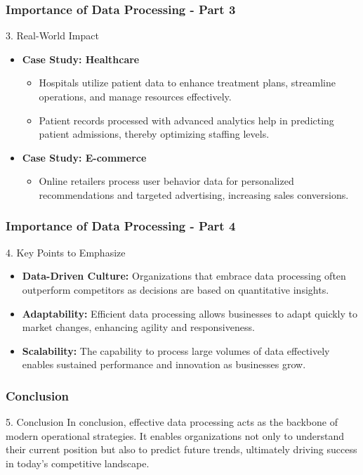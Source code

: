 \documentclass[aspectratio=169]{beamer}
\begin{document}
\begin{frame}[fragile]
    \frametitle{Importance of Data Processing - Part 3}
    \begin{block}{3. Real-World Impact}
        \begin{itemize}
            \item \textbf{Case Study: Healthcare}
            \begin{itemize}
                \item Hospitals utilize patient data to enhance treatment plans, streamline operations, and manage resources effectively.
                \item Patient records processed with advanced analytics help in predicting patient admissions, thereby optimizing staffing levels.
            \end{itemize}
            \item \textbf{Case Study: E-commerce}
            \begin{itemize}
                \item Online retailers process user behavior data for personalized recommendations and targeted advertising, increasing sales conversions.
            \end{itemize}
        \end{itemize}
    \end{block}
\end{frame}

\begin{frame}[fragile]
    \frametitle{Importance of Data Processing - Part 4}
    \begin{block}{4. Key Points to Emphasize}
        \begin{itemize}
            \item \textbf{Data-Driven Culture:} Organizations that embrace data processing often outperform competitors as decisions are based on quantitative insights.
            \item \textbf{Adaptability:} Efficient data processing allows businesses to adapt quickly to market changes, enhancing agility and responsiveness.
            \item \textbf{Scalability:} The capability to process large volumes of data effectively enables sustained performance and innovation as businesses grow.
        \end{itemize}
    \end{block}
\end{frame}

\begin{frame}[fragile]
    \frametitle{Conclusion}
    \begin{block}{5. Conclusion}
        In conclusion, effective data processing acts as the backbone of modern operational strategies. 
        It enables organizations not only to understand their current position but also to predict future trends, ultimately driving success in today's competitive landscape.
    \end{block}
\end{frame}
\end{document}
